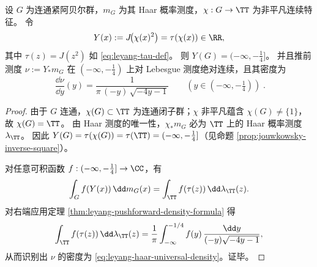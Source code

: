 \begin{theorem}\label{thm:leyang-inverse-square-haar-universality}
设 \(G\) 为连通紧阿贝尔群，\(m_G\) 为其 Haar 概率测度，\(\chi:G\to\TT\) 为非平凡连续特征。
令
\[
Y(x):=J\!\bigl(\chi(x)^2\bigr)=\tau(\chi(x))\in\RR,
\]
其中 \(\tau(z)=J(z^2)\) 如 \eqref{eq:leyang-tau-def}。
则 \(Y(G)=(-\infty,-\tfrac14]\)。
并且推前测度 \(\nu:=Y_{\ast}m_G\) 在 \((-\infty,-\tfrac14)\) 上对 Lebesgue 测度绝对连续，且其密度为
\begin{equation}\label{eq:leyang-haar-universal-density}
\boxed{\;
\frac{\dd\nu}{\dd y}(y)=\frac{1}{\pi\,(-y)\,\sqrt{-4y-1}}\qquad(y\in(-\infty,-\tfrac14))\; }.
\end{equation}
\end{theorem}
\begin{proof}
由于 \(G\) 连通，\(\chi(G)\subset\TT\) 为连通闭子群；\(\chi\) 非平凡蕴含 \(\chi(G)\neq\{1\}\)，故 \(\chi(G)=\TT\)。
由 Haar 测度的唯一性，\(\chi_{\ast}m_G\) 必为 \(\TT\) 上的 Haar 概率测度 \(\lambda_{\TT}\)。
因此 \(Y(G)=\tau(\chi(G))=\tau(\TT)=(-\infty,-\tfrac14]\)（见命题 \ref{prop:jouwkowsky-inverse-square}）。
\par
对任意可积函数 \(f:(-\infty,-\tfrac14]\to\CC\)，有
\[
\int_G f(Y(x))\,\dd m_G(x)
=\int_{\TT} f(\tau(z))\,\dd\lambda_{\TT}(z).
\]
对右端应用定理 \ref{thm:leyang-pushforward-density-formula} 得
\[
\int_{\TT} f(\tau(z))\,\dd\lambda_{\TT}(z)
=\frac{1}{\pi}\int_{-\infty}^{-1/4} f(y)\,\frac{\dd y}{(-y)\sqrt{-4y-1}},
\]
从而识别出 \(\nu\) 的密度为 \eqref{eq:leyang-haar-universal-density}。证毕。
\end{proof}

